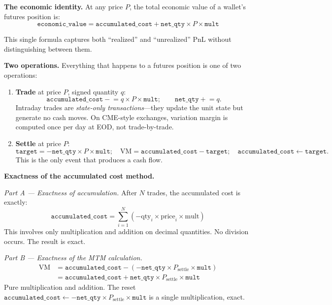 \documentclass[11pt,a4paper]{article}
\begin{document}
\medskip
\noindent\textbf{The economic identity.}
At any price $P$, the total economic value of a wallet's futures position is:
\[
\texttt{economic\_value} = \texttt{accumulated\_cost} + \texttt{net\_qty} \times P \times \texttt{mult}
\]

\noindent This single formula captures both ``realized'' and ``unrealized'' PnL without distinguishing between them.

\medskip
\noindent\textbf{Two operations.}
Everything that happens to a futures position is one of two operations:

\begin{enumerate}[nosep]
\item \textbf{Trade} at price $P$, signed quantity $q$:
\[
\texttt{accumulated\_cost} \mathrel{-}= q \times P \times \texttt{mult}; \qquad \texttt{net\_qty} \mathrel{+}= q.
\]
Intraday trades are \emph{state-only transactions}---they update the unit state but generate no cash moves.  On CME-style exchanges, variation margin is computed once per day at EOD, not trade-by-trade.
\item \textbf{Settle} at price $P$:
\[
\texttt{target} = -\texttt{net\_qty} \times P \times \texttt{mult}; \quad \text{VM} = \texttt{accumulated\_cost} - \texttt{target}; \quad \texttt{accumulated\_cost} \leftarrow \texttt{target}.
\]
This is the only event that produces a cash flow.
\end{enumerate}

\medskip
\noindent\textbf{Exactness of the accumulated cost method.}

\smallskip
\noindent\emph{Part A --- Exactness of accumulation.}
After $N$ trades, the accumulated cost is exactly:
\[
\texttt{accumulated\_cost} = \sum_{i=1}^{N} (-\text{qty}_i \times \text{price}_i \times \text{mult})
\]
This involves only multiplication and addition on decimal quantities.  No division occurs.  The result is exact.

\smallskip
\noindent\emph{Part B --- Exactness of the MTM calculation.}
\begin{align*}
\text{VM} &= \texttt{accumulated\_cost} - (-\texttt{net\_qty} \times P_{\text{settle}} \times \texttt{mult}) \\
          &= \texttt{accumulated\_cost} + \texttt{net\_qty} \times P_{\text{settle}} \times \texttt{mult}
\end{align*}
Pure multiplication and addition.  The reset $\texttt{accumulated\_cost} \leftarrow -\texttt{net\_qty} \times P_{\text{settle}} \times \texttt{mult}$ is a single multiplication, exact.
\end{document}
